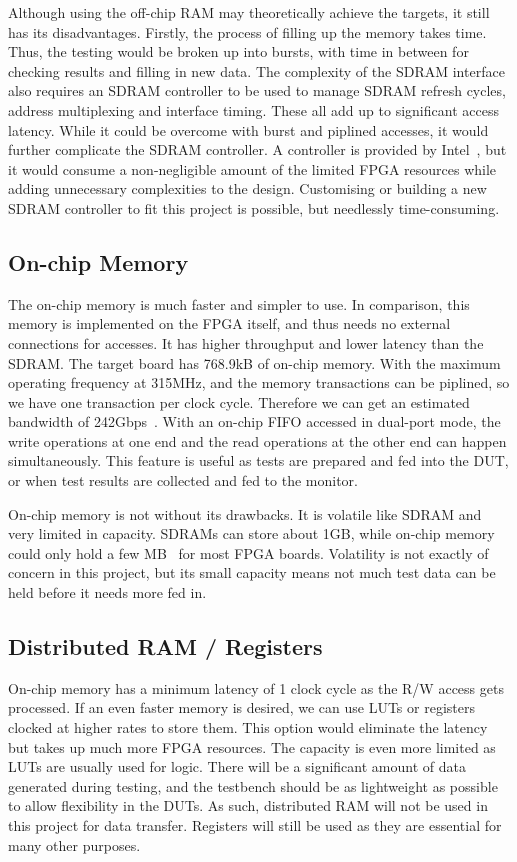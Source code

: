 Although using the off-chip RAM may theoretically achieve the targets, it still has its disadvantages.
Firstly, the process of filling up the memory takes time.
Thus, the testing would be broken up into bursts, with time in between for checking results and filling in new data.
The complexity of the SDRAM interface also requires an SDRAM controller to be used to manage SDRAM refresh cycles, address multiplexing and interface timing.
These all add up to significant access latency.
While it could be overcome with burst and piplined accesses, it would further complicate the SDRAM controller.
A controller is provided by Intel~\cite{Altera3}, but it would consume a non-negligible amount of the limited FPGA resources while adding unnecessary complexities to the design.
Customising or building a new SDRAM controller to fit this project is possible, but needlessly time-consuming.

\subsection{On-chip Memory}
The on-chip memory is much faster and simpler to use.
In comparison, this memory is implemented on the FPGA itself, and thus needs no external connections for accesses.
It has higher throughput and lower latency than the SDRAM.
The target board has 768.9kB of on-chip memory.
With the maximum operating frequency at 315MHz, and the memory transactions can be piplined, so we have one transaction per clock cycle.
Therefore we can get an estimated bandwidth of 242Gbps~\cite{Intel4}.
With an on-chip FIFO accessed in dual-port mode, the write operations at one end and the read operations at the other end can happen simultaneously.
This feature is useful as tests are prepared and fed into the DUT, or when test results are collected and fed to the monitor.

On-chip memory is not without its drawbacks.
It is volatile like SDRAM and very limited in capacity.
SDRAMs can store about 1GB, while on-chip memory could only hold a few MB~\cite{Altera2} for most FPGA boards.
Volatility is not exactly of concern in this project, but its small capacity means not much test data can be held before it needs more fed in.

\subsection{Distributed RAM / Registers}
On-chip memory has a minimum latency of 1 clock cycle as the R/W access gets processed.
If an even faster memory is desired, we can use LUTs or registers clocked at higher rates to store them.
This option would eliminate the latency but takes up much more FPGA resources.
The capacity is even more limited as LUTs are usually used for logic.
There will be a significant amount of data generated during testing, and the testbench should be as lightweight as possible to allow flexibility in the DUTs.
As such, distributed RAM will not be used in this project for data transfer.
Registers will still be used as they are essential for many other purposes.

